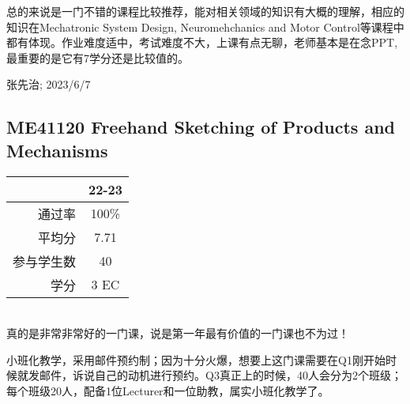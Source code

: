 总的来说是一门不错的课程比较推荐，能对相关领域的知识有大概的理解，相应的知识在Mechatronic System Design, Neuromehchanics and Motor Control等课程中都有体现。作业难度适中，考试难度不大，上课有点无聊，老师基本是在念PPT,最重要的是它有7学分还是比较值的。
\begin{flushright}
张先治; 2023/6/7
\end{flushright}

\subsection{ME41120 Freehand Sketching of Products and Mechanisms}
\begin{minipage}{0.45\textwidth}
\centering
{}
\end{minipage}%
\begin{minipage}{0.45\textwidth}
\raggedleft
\begin{tabular}{r|c}
\textbf{ } & \textbf{22-23} \\ \hline
通过率 & 100\% \\ 
平均分 & 7.71 \\ 
参与学生数 & 40 \\
学分 & 3 EC\\
\end{tabular}
\end{minipage}\\

真的是非常非常好的一门课，说是第一年最有价值的一门课也不为过！

小班化教学，采用邮件预约制；因为十分火爆，想要上这门课需要在Q1刚开始时候就发邮件，诉说自己的动机进行预约。Q3真正上的时候，40人会分为2个班级；每个班级20人，配备1位Lecturer和一位助教，属实小班化教学了。

